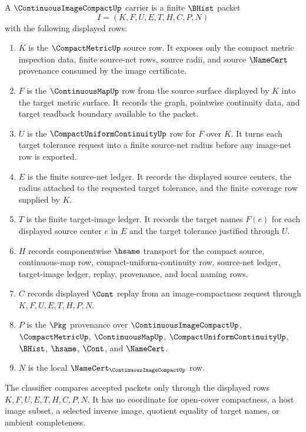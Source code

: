 \begin{definition}
\label{def:continuous-image-compact-carrier}
A $\ContinuousImageCompactUp$ carrier is a finite $\BHist$ packet
$$
I=(K,F,U,E,T,H,C,P,N)
$$
with the following displayed rows:
\begin{enumerate}
\item $K$ is the $\CompactMetricUp$ source row. It exposes only the compact metric inspection data, finite source-net rows, source radii, and source $\NameCert$ provenance consumed by the image certificate.
\item $F$ is the $\ContinuousMapUp$ row from the source surface displayed by $K$ into the target metric surface. It records the graph, pointwise continuity data, and target readback boundary available to the packet.
\item $U$ is the $\CompactUniformContinuityUp$ row for $F$ over $K$. It turns each target tolerance request into a finite source-net radius before any image-net row is exported.
\item $E$ is the finite source-net ledger. It records the displayed source centers, the radius attached to the requested target tolerance, and the finite coverage row supplied by $K$.
\item $T$ is the finite target-image ledger. It records the target names $F(e)$ for each displayed source center $e$ in $E$ and the target tolerance justified through $U$.
\item $H$ records componentwise $\hsame$ transport for the compact source, continuous-map row, compact-uniform-continuity row, source-net ledger, target-image ledger, replay, provenance, and local naming rows.
\item $C$ records displayed $\Cont$ replay from an image-compactness request through $K,F,U,E,T,H,P,N$.
\item $P$ is the $\Pkg$ provenance over $\ContinuousImageCompactUp$, $\CompactMetricUp$, $\ContinuousMapUp$, $\CompactUniformContinuityUp$, $\BHist$, $\hsame$, $\Cont$, and $\NameCert$.
\item $N$ is the local $\NameCert_{\ContinuousImageCompactUp}$ row.
\end{enumerate}
The classifier compares accepted packets only through the displayed rows $K,F,U,E,T,H,C,P,N$. It has no coordinate for open-cover compactness, a host image subset, a selected inverse image, quotient equality of target names, or ambient completeness.
\end{definition}

